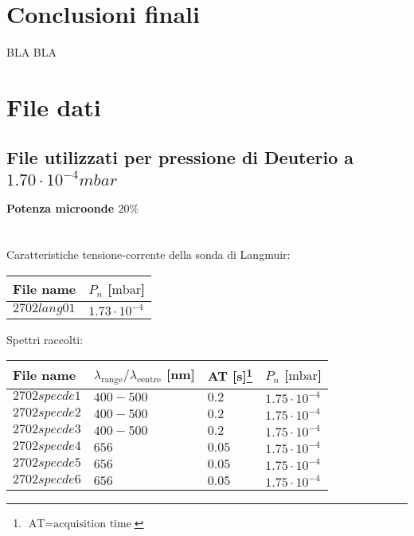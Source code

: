 \section{Conclusioni finali}
BLA BLA

\section{File dati}
\subsection{File utilizzati per pressione di Deuterio a $1.70\cdot10^{-4}mbar$}

\paragraph*{Potenza microonde $\text{20\%}$} ~\\
Caratteristiche tensione-corrente della sonda di Langmuir:
\begin{center}
\begin{tabular}{p{3cm}p{3cm}}
\toprule
File name	&$P_{n}$ [$\si{\milli\bar}$]\\
\midrule
$2702lang01$	&$1.73\cdot10^{-4}$\\
\bottomrule
\end{tabular}
\end{center}

Spettri raccolti:
\begin{center}
\begin{tabular}{p{3cm}p{4cm}p{2cm}p{3cm}}
\toprule
File name	&$\lambda_\text{range}\text{/}\lambda_\text{centre}$ [nm] &AT [s]\footnote{$\text{AT}=\text{acquisition time}$} &$P_{n}$ [$\si{\milli\bar}$]\\
\midrule
$2702specde1$	&$400-500$	&$0.2$		&$1.75\cdot10^{-4}$\\
$2702specde2$	&$400-500$	&$0.2$		&$1.75\cdot10^{-4}$\\
$2702specde3$	&$400-500$	&$0.2$		&$1.75\cdot10^{-4}$\\
$2702specde4$	&$656$		&$0.05$		&$1.75\cdot10^{-4}$\\
$2702specde5$	&$656$		&$0.05$		&$1.75\cdot10^{-4}$\\
$2702specde6$	&$656$		&$0.05$		&$1.75\cdot10^{-4}$\\

\bottomrule
\end{tabular}
\end{center}

